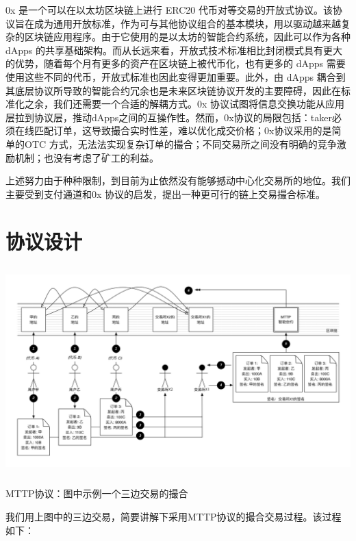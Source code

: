 \documentclass[UTF8,nofonts]{ctexart}
\makeatletter
\newenvironment{figurehere}
  {\def\@captype{figure}}
  {}
\makeatother
\begin{document}
0x \cite{warren20170x} 是一个可以在以太坊区块链上进行 ERC20\cite{ERC20} 代币对等交易的开放式协议。该协议旨在成为通用开放标准，作为可与其他协议组合的基本模块，用以驱动越来越复杂的区块链应用程序。由于它使用的是以太坊的智能合约系统，因此可以作为各种 dApps 的共享基础架构。而从长远来看，开放式技术标准相比封闭模式具有更大的优势，随着每个月有更多的资产在区块链上被代币化，也有更多的 dApps 需要使用这些不同的代币，开放式标准也因此变得更加重要。此外，由 dApps 耦合到其底层协议所导致的智能合约冗余也是未来区块链协议开发的主要障碍，因此在标准化之余，我们还需要一个合适的解耦方式。0x 协议试图将信息交换功能从应用层拉到协议层，推动dApps之间的互操作性。然而，0x协议的局限包括：taker必须在线匹配订单，这导致撮合实时性差，难以优化成交价格；0x协议采用的是简单的OTC 方式，无法法实现复杂订单的撮合；不同交易所之间没有明确的竞争激励机制；也没有考虑了矿工的利益。

上述努力由于种种限制，到目前为止依然没有能够撼动中心化交易所的地位。我们主要受到支付通道和0x 协议的启发，提出一种更可行的链上交易撮合标准。


\section{协议设计\label{sec:protocol}}

\begin{center}
\begin{figurehere}
\includegraphics[height=8cm]{images/zh_protocol.png}
\caption{MTTP协议：图中示例一个三边交易的撮合}
\label{fig:MTTPprotocol}
\end{figurehere}
\end{center}

我们用上图中的三边交易，简要讲解下采用MTTP协议的撮合交易过程。该过程如下：
\end{document}
